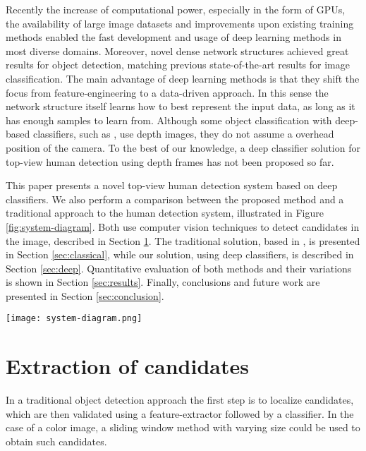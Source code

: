   Recently the increase of computational power, especially in the form of GPUs, the availability of large image datasets and improvements upon existing training methods \cite{nair2010relu} enabled the fast development and usage of deep learning methods in most diverse domains. Moreover, novel dense network structures \cite{NIPS2013_5207} achieved great results for object detection, matching previous state-of-the-art results \cite{hintonCONVNET} for image classification. The main advantage of deep learning methods is that they shift the focus from feature-engineering to a data-driven approach. In this sense the network structure itself learns how to best represent the input data, as long as it has enough samples to learn from. Although some object classification with deep-based classifiers, such as \cite{thornberg2015combining}, use depth images, they do not assume a overhead position of the camera. To the best of our knowledge, a deep classifier solution for top-view human detection using depth frames has not been proposed so far.

  This paper presents a novel top-view human detection system based on deep classifiers. We also perform a comparison between the proposed method and a traditional approach to the human detection system, illustrated in Figure \ref{fig:system-diagram}. Both use computer vision techniques to detect candidates in the image, described in Section \ref{sec:candidates}. The traditional solution, based in \cite{rauter}, is presented in Section \ref{sec:classical}, while our solution, using deep classifiers, is described in Section \ref{sec:deep}. Quantitative evaluation of both methods and their variations is shown in Section \ref{sec:results}. Finally, conclusions and future work are presented in Section \ref{sec:conclusion}.

  \begin{figure*}[!t]
  \centering
  \texttt{[image: system-diagram.png]}
  \caption{Human detection system diagram. Two candidates are detected on the input frame.  }
  \label{fig:system-diagram}
  \end{figure*}

\section{Extraction of candidates}
\label{sec:candidates}

    In a traditional object detection approach \cite{traditional-objdetect} the first step is to localize candidates, which are then validated using a feature-extractor followed by a classifier. In the case of a color image, a sliding window method with varying size could be used to obtain such candidates.

